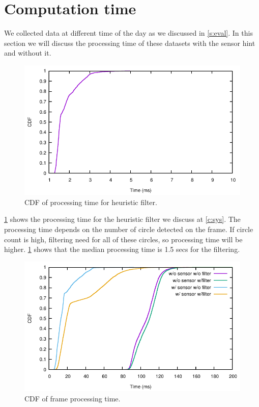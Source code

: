 \section{Computation time}
We collected data at different time of the day as we discussed in \ref{s:eval}.
In this section we will discuss the processing time of these datasets with the sensor hint and without it.

\begin{figure}[h!]
\centering
\includegraphics[width=5.2in]{plots/sunny_cdf_filter.pdf}
\caption{CDF of processing time for heuristic filter.}
\label{f:cdf_fil}
\end{figure}

\ref{f:cdf_fil} shows the processing time for the heuristic filter we discuss at \ref{c:sys}.
The processing time depends on the number of circle detected on the frame.
If circle count is high, filtering need for all of these circles, so processing time will be higher.
\ref{f:cdf_fil} shows that the median processing time is 1.5 secs for the filtering. 



\begin{figure}[h!]
\centering
\includegraphics[width=5.2in]{plots/walk_cdf_time.pdf}
\caption{CDF of frame processing time.}
\label{f:cdf_time}
\end{figure}


